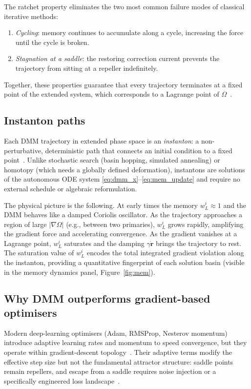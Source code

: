 \documentclass[10pt,twocolumn]{article}
\begin{document}
The ratchet property eliminates the two most common failure modes of classical
iterative methods:
\begin{enumerate}
  \item \emph{Cycling}: memory continues to accumulate along a cycle, increasing
    the force until the cycle is broken.
  \item \emph{Stagnation at a saddle}: the restoring correction current
    prevents the trajectory from sitting at a repeller indefinitely.
\end{enumerate}
Together, these properties guarantee that every trajectory terminates at a
fixed point of the extended system, which corresponds to a Lagrange point of
$\Omega$~\cite{diventra2022}.

\subsection{Instanton paths}

Each DMM trajectory in extended phase space is an \emph{instanton}: a
non-perturbative, deterministic path that connects an initial condition to a
fixed point~\cite{diventra2022}.
Unlike stochastic search (basin hopping, simulated annealing) or homotopy
(which needs a globally defined deformation), instantons are solutions of the
autonomous ODE system \eqref{eq:dmm_x}--\eqref{eq:mem_update} and require no
external schedule or algebraic reformulation.

The physical picture is the following.
At early times the memory $w_L^i\approx1$ and the DMM behaves like a damped
Coriolis oscillator.
As the trajectory approaches a region of large $|\nabla\Omega|$ (e.g.,
between two primaries), $w_L^i$ grows rapidly, amplifying the gradient force
and accelerating convergence.
As the gradient vanishes at a Lagrange point, $w_L^i$ saturates and the
damping $\gamma\dot{\mathbf{r}}$ brings the trajectory to rest.
The saturation value of $w_L^i$ encodes the total integrated gradient
violation along the instanton, providing a quantitative fingerprint of each
solution basin (visible in the memory dynamics panel, Figure~\ref{fig:mem}).

\subsection{Why DMM outperforms gradient-based optimisers}

Modern deep-learning optimisers (Adam, RMSProp, Nesterov momentum) introduce
adaptive learning rates and momentum to speed convergence, but they operate
within gradient-descent topology~\cite{kingma2014}.
Their adaptive terms modify the effective step size but not the fundamental
attractor structure: saddle points remain repellers, and escape from a saddle
requires noise injection or a specifically engineered loss
landscape~\cite{dauphin2014,jin2017}.
\end{document}
